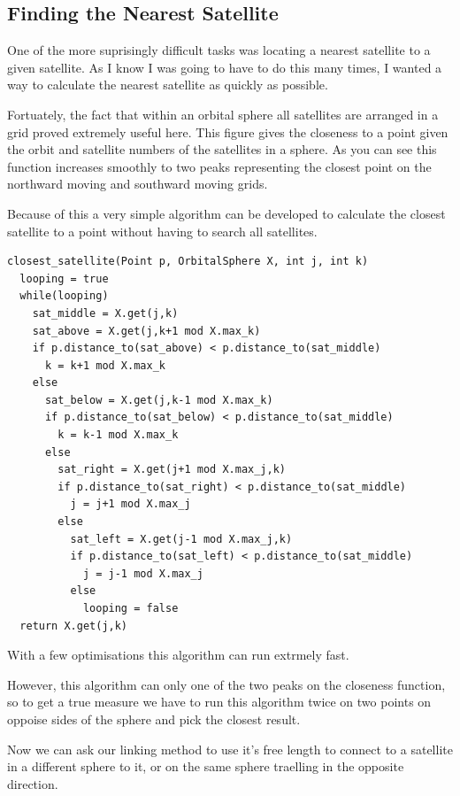 \documentclass[12pt]{article}
\begin{document}

\subsection{Finding the Nearest Satellite}

One of the more suprisingly difficult tasks was locating a nearest satellite to a given satellite. As I know I was going to have to do this many times, I wanted a way to calculate the nearest satellite as quickly as possible.

Fortuately, the fact that within an orbital sphere all satellites are arranged in a grid proved extremely useful here. This figure gives the closeness to a point given the orbit and satellite numbers of the satellites in a sphere. As you can see this function increases smoothly to two peaks representing the closest point on the northward moving and southward moving grids.


Because of this a very simple algorithm can be developed to calculate the closest satellite to a point without having to search all satellites.

\begin{lstlisting}
closest_satellite(Point p, OrbitalSphere X, int j, int k)
  looping = true
  while(looping)
    sat_middle = X.get(j,k)
    sat_above = X.get(j,k+1 mod X.max_k)
    if p.distance_to(sat_above) < p.distance_to(sat_middle)
      k = k+1 mod X.max_k
    else 
      sat_below = X.get(j,k-1 mod X.max_k)
      if p.distance_to(sat_below) < p.distance_to(sat_middle)
        k = k-1 mod X.max_k
      else
        sat_right = X.get(j+1 mod X.max_j,k)
        if p.distance_to(sat_right) < p.distance_to(sat_middle)
          j = j+1 mod X.max_j
        else
          sat_left = X.get(j-1 mod X.max_j,k)
          if p.distance_to(sat_left) < p.distance_to(sat_middle)
            j = j-1 mod X.max_j
          else
            looping = false
  return X.get(j,k)
\end{lstlisting}

With a few optimisations this algorithm can run extrmely fast.

However, this algorithm can only one of the two peaks on the closeness function, so to get a true measure we have to run this algorithm twice on two points on oppoise sides of the sphere and pick the closest result.

Now we can ask our linking method to use it's free length to connect to a satellite in a different sphere to it, or on the same sphere traelling in the opposite direction.
\end{document}
